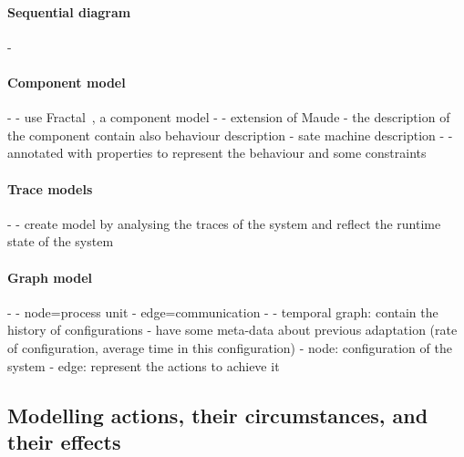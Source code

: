 \paragraph{Sequential diagram}
- \cite{DBLP:conf/icse/TaharaOH17}

	
\paragraph{Component model} %
- \cite{DBLP:conf/soco/DavidL06}
	- use Fractal~\cite{DBLP:conf/cbse/BrunetonCLQS04}, a component model
- \cite{DBLP:conf/wetice/DjoudiBZ14}
	- extension of Maude
	- the description of the component contain also behaviour description
		- sate machine description
- \cite{DBLP:journals/computer/GarlanCHSS04}
	- annotated with properties to represent the behaviour and some constraints
	
\paragraph{Trace models}
- \cite{DBLP:journals/computer/Maoz09}
	- create model by analysing the traces of the system and reflect the runtime state of the system
	
\paragraph{Graph model}
- \cite{DBLP:journals/tse/KramerM90}
	- node=process unit
	- edge=communication
- \cite{DBLP:journals/computer/GeorgasHT09}
	- temporal graph: contain the history of configurations
	- have some meta-data about previous adaptation (rate of configuration, average time in this configuration)
	- node: configuration of the system
	- edge: represent the actions to achieve it
	
	
	
	
	
	
	
	
	
\subsection[Modelling actions, their circumstances, and their effects]{Modelling \glspl{action}, their \glspl{circumstance}, and their effects}

